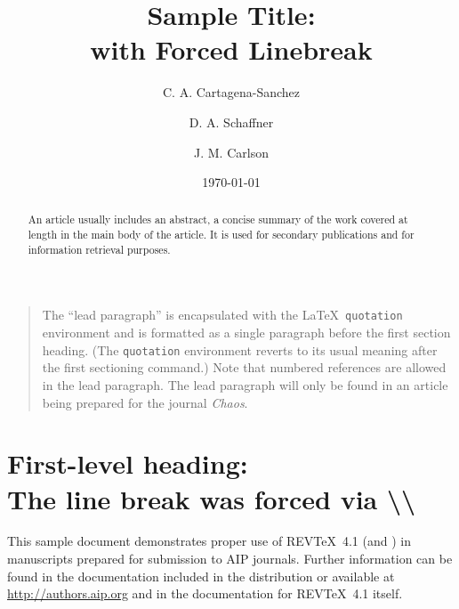 \documentclass[%
 aip,
 amsmath,amssymb,
preprint,%
]{revtex4-1}
\begin{document}

\title[Sample title]{Sample Title:\\with Forced Linebreak}
\author{C. A. Cartagena-Sanchez}

\author{D. A. Schaffner}%

\author{J. M. Carlson}
\date{\today}%

\begin{abstract}
An article usually includes an abstract, a concise summary of the work
covered at length in the main body of the article. It is used for
secondary publications and for information retrieval purposes. 
\end{abstract}

\maketitle

\begin{quotation}
The ``lead paragraph'' is encapsulated with the \LaTeX\ 
\verb+quotation+ environment and is formatted as a single paragraph before the first section heading. 
(The \verb+quotation+ environment reverts to its usual meaning after the first sectioning command.) 
Note that numbered references are allowed in the lead paragraph.
%
The lead paragraph will only be found in an article being prepared for the journal \textit{Chaos}.
\end{quotation}

\section{\label{sec:level1}First-level heading:\protect\\ The line
break was forced \lowercase{via} \textbackslash\textbackslash}

This sample document demonstrates proper use of REV\TeX~4.1 (and
\LaTeXe) in manuscripts prepared for submission to AIP
journals. Further information can be found in the documentation included in the distribution or available at
\url{http://authors.aip.org} and in the documentation for 
REV\TeX~4.1 itself.
\end{document}

